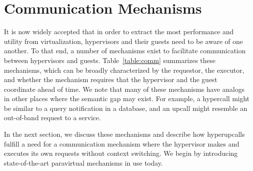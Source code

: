 \documentclass[11pt]{article}
\newcommand{\hypercallback}{hyperupcall\xspace{}}
\begin{document}

	
	




\section{Communication Mechanisms}
\label{sec:background}

It is now widely accepted that in order to extract the most 
performance and utility from virtualization, hypervisors 
and their guests need to be aware of one another.
To that end, a number of mechanisms exist to facilitate 
communication between hypervisors and guests. Table~\ref{table:comm} 
summarizes these mechanisms, which can be broadly characterized by
the requestor, the executor, 
and whether the mechanism requires that the hypervisor
and the guest coordinate ahead of time. We note that many of these
mechanisms have analogs in other places where the semantic gap may exist.
For example, a hypercall might be similar to a query notification in a database, and
an upcall might resemble an out-of-band request to a service. 

In the next section, we discuss these mechanisms 
and describe how \hypercallback{}s fulfill a need for a 
communication mechanism where the hypervisor makes and 
executes its own requests without context switching. 
We begin by introducing state-of-the-art paravirtual
mechanisms in use today. 
\end{document}
